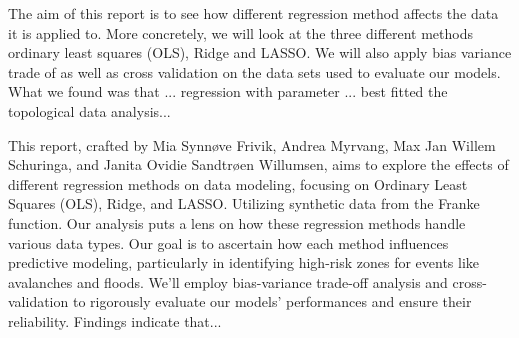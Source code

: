 \thispagestyle{plain}

\noindent The aim of this report is to see how different regression method affects the data it is applied to. 
More concretely, we will look at the three different methods ordinary least squares (OLS), Ridge and LASSO. 
We will also apply bias variance trade of as well as cross validation on the data sets used to evaluate our models.
What we found was that ... regression with parameter ... best fitted the topological data analysis...

This report, crafted by Mia Synnøve Frivik, Andrea Myrvang, Max Jan Willem Schuringa, and Janita Ovidie Sandtrøen Willumsen, aims to explore the effects of different regression methods on data modeling, focusing on Ordinary Least Squares (OLS), Ridge, and LASSO. Utilizing synthetic data from the Franke function. Our analysis puts a lens on how these regression methods handle various data types. Our goal is to ascertain how each method influences predictive modeling, particularly in identifying high-risk zones for events like avalanches and floods. We'll employ bias-variance trade-off analysis and cross-validation to rigorously evaluate our models' performances and ensure their reliability. Findings indicate that...